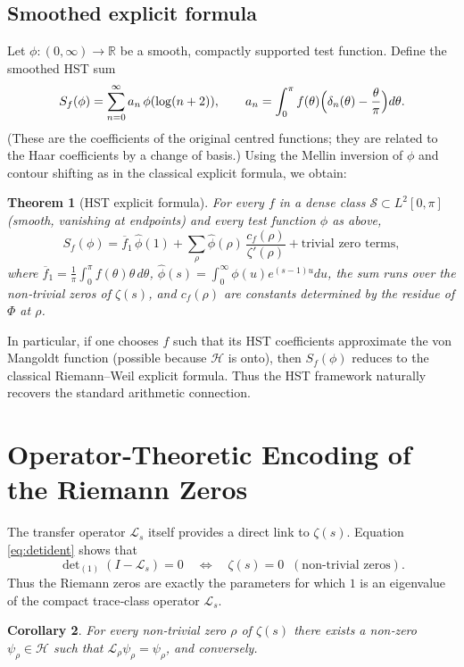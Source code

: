 \documentclass[11pt,a4paper]{article}
\newtheorem{theorem}{Theorem}[section]
\newtheorem{corollary}[theorem]{Corollary}
\theoremstyle{remark}
\begin{document}
\subsection{Smoothed explicit formula}
Let \(\phi:(0,\infty)\to\mathbb{R}\) be a smooth, compactly supported test function. Define the smoothed HST sum
\[
S_f(\phi)=\sum_{n=0}^{\infty}a_n\,\phi(\log(n+2)),\qquad
a_n=\int_0^\pi f(\theta)\Bigl(\delta_n(\theta)-\frac{\theta}{\pi}\Bigr)d\theta .
\]
(These are the coefficients of the original centred functions; they are related to the Haar coefficients by a change of basis.) Using the Mellin inversion of \(\phi\) and contour shifting as in the classical explicit formula, we obtain:

\begin{theorem}[HST explicit formula]\label{thm:explicit}
For every \(f\) in a dense class \(\mathcal{S}\subset L^2[0,\pi]\) (smooth, vanishing at endpoints) and every test function \(\phi\) as above,
\[
S_f(\phi)=\overline{f}_1\,\widehat{\phi}(1)
         +\sum_{\rho}\widehat{\phi}(\rho)\,\frac{c_f(\rho)}{\zeta'(\rho)}
         +\text{trivial zero terms},
\]
where \(\overline{f}_1=\frac{1}{\pi}\int_0^\pi f(\theta)\theta\,d\theta\), \(\widehat{\phi}(s)=\int_0^\infty\phi(u)e^{(s-1)u}du\), the sum runs over the non‑trivial zeros of \(\zeta(s)\), and \(c_f(\rho)\) are constants determined by the residue of \(\Phi\) at \(\rho\).
\end{theorem}
In particular, if one chooses \(f\) such that its HST coefficients approximate the von Mangoldt function (possible because \(\mathcal{H}\) is onto), then \(S_f(\phi)\) reduces to the classical Riemann–Weil explicit formula. Thus the HST framework naturally recovers the standard arithmetic connection.

\section{Operator‑Theoretic Encoding of the Riemann Zeros}

The transfer operator \(\mathcal{L}_s\) itself provides a direct link to \(\zeta(s)\). Equation \eqref{eq:detident} shows that
\[
\det\nolimits_{(1)}(I-\mathcal{L}_s)=0 \quad\Longleftrightarrow\quad \zeta(s)=0\;\;(\text{non‑trivial zeros}).
\]
Thus the Riemann zeros are exactly the parameters for which \(1\) is an eigenvalue of the compact trace‑class operator \(\mathcal{L}_s\).

\begin{corollary}
For every non‑trivial zero \(\rho\) of \(\zeta(s)\) there exists a non‑zero \(\psi_\rho\in\mathcal{H}\) such that \(\mathcal{L}_\rho\psi_\rho=\psi_\rho\), and conversely.
\end{corollary}
\end{document}
